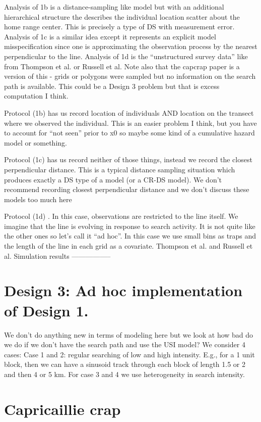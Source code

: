 Analysis of 1b is a distance-sampling like model but with an additional hierarchical structure the describes the individual location scatter about the home range center. This is precisely a type of DS with measurement error. Analysis of 1c is a similar idea except it represents an explicit model misspecification since one is approximating the observation process by the nearest perpendicular to the line.  Analysis of 1d is the ``unstructured survey data'' like from Thompson et al. or Russell et al.  Note also that the capcrap paper is a version of this - grids or polygons were sampled but no information on the search path is available. This could be a Design 3 problem but that is excess computation I think. 

Protocol (1b) has us record location of individuals AND location on the transect where we observed the individual. This is an easier problem I think, but you have to account for ``not seen'' prior  to x0 so maybe some kind of a cumulative hazard model or something. 

Protocol (1c) has us record neither of those things, instead we record the closest perpendicular distance. This is a typical distance sampling situation which produces exactly a DS type of a model (or a CR-DS model). We don't recommend recording closest perpendicular distance and we don't discuss these models too much here

Protocol (1d) . In this case, observations are restricted to the line itself. We imagine that the line is evolving in response to search activity. It is not quite like the other ones so let's call it ``ad hoc''. In this case we use small bins as traps and the length of the line in each grid as a covariate. Thompson et al. and Russell et al.
Simulation results -----------------



\section{ Design 3: Ad hoc implementation of Design 1. }

We don't do anything new in terms of modeling here but we look at how
bad do we do if we don't have the search path and use the USI model?
We consider 4 cases: Case 1 and 2: regular searching of low and high
intensity. E.g., for a 1 unit block, then we can have a sinusoid track
through each block of length 1.5 or 2 and then 4 or 5 km.  For case 3
and 4 we use heterogeneity in search intensity.


\section{Capricaillie crap}


